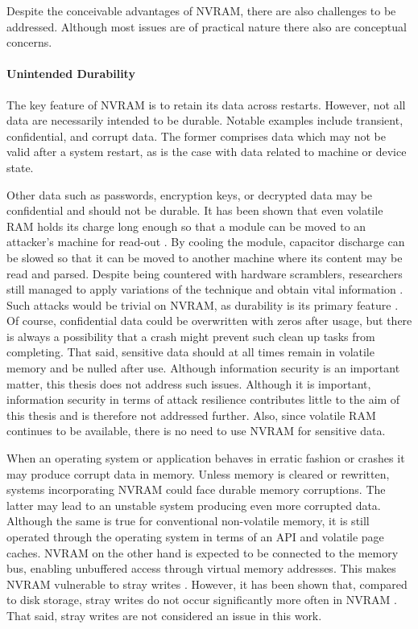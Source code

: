 Despite the conceivable advantages of NVRAM, there are also challenges to be
addressed. Although most issues are of practical nature there also are
conceptual concerns.

\paragraph{Unintended Durability}

The key feature of NVRAM is to retain its data across restarts. However, not all
data are necessarily intended to be durable. Notable examples include transient,
confidential, and corrupt data. The former comprises data which may not be valid
after a system restart, as is the case with data related to machine or device
state.

Other data such as passwords, encryption keys, or decrypted data may be
confidential and should not be durable. It has been shown that even volatile RAM
holds its charge long enough so that a module can be moved to an attacker's
machine for read-out \cite{halderman2008lest}. By cooling the module, capacitor
discharge can be slowed so that it can be moved to another machine where its
content may be read and parsed. Despite being countered with hardware
scramblers, researchers still managed to apply variations of the technique and
obtain vital information \cite{yitbarek2017cold}. Such attacks would be trivial
on NVRAM, as durability is its primary feature \cite{bailey2011operating}. Of
course, confidential data could be overwritten with zeros after usage, but there
is always a possibility that a crash might prevent such clean up tasks from
completing. That said, sensitive data should at all times remain in volatile
memory and be nulled after use. Although information security is an important
matter, this thesis does not address such issues. Although it is important,
information security in terms of attack resilience contributes little to the aim
of this thesis and is therefore not addressed further. Also, since volatile RAM continues to be available, there is no need to use NVRAM for sensitive data.

When an operating system or application behaves in erratic fashion or crashes it
may produce corrupt data in memory. Unless memory is cleared or rewritten,
systems incorporating NVRAM could face durable memory corruptions. The latter
may lead to an unstable system producing even more corrupted data. Although the
same is true for conventional non-volatile memory, it is still operated through
the operating system in terms of an API and volatile page caches. NVRAM on the
other hand is expected to be connected to the memory bus, enabling unbuffered
access through virtual memory addresses. This makes NVRAM vulnerable to stray
writes \cite{condit2009better, venkataraman2011consistent}. However, it has been
shown that, compared to disk storage, stray writes do not occur significantly
more often in NVRAM \cite{chen1996rio}. That said, stray writes are not considered an issue in this work.

